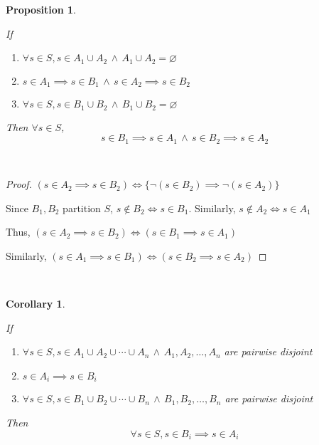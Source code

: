\documentclass{article}
\newtheorem*{thm}{Proposition}
\newtheorem*{corollary}{Corollary}
\theoremstyle{definition}\newtheorem{definition}{Definition}
\begin{document}
	\begin{thm}\
	
	If
		\begin{enumerate}
			\item $\forall s \in S, s\in A_1 \cup A_2 \, \land \, A_1 \cup A_2 = \varnothing$ 
			\item $s\in A_1 \implies s \in B_1 \, \land \, s\in A_2 \implies s \in B_2$
			\item $\forall s \in S, s\in B_1 \cup B_2 \, \land \, B_1 \cup B_2 = \varnothing$
		\end{enumerate}
	Then $\forall s \in S$,
		$$s\in B_1 \implies s \in A_1 \, \land \, s\in B_2 \implies s \in A_2$$
	\end{thm}
	\
	\begin{proof}
			$(s\in A_2 \implies s \in B_2) \iff \{ \lnot (s \in B_2) \implies \lnot (s\in A_2) \}$
			
			Since $B_1, B_2$ partition $S$, $s \not\in B_2 \iff s\in B_1$. Similarly, $s \not\in A_2 \iff s\in A_1$ 
			
			Thus, $(s\in A_2 \implies s \in B_2) \iff (s\in B_1 \implies s \in A_1)$
			
			Similarly, $(s\in A_1 \implies s \in B_1) \iff (s\in B_2 \implies s \in A_2)$ 
	\end{proof}
	
\	
	\begin{corollary}\
	
	If
		\begin{enumerate}
			\item $\forall s \in S, s\in A_1 \cup A_2 \cup \cdots \cup A_n \, \land \, A_1,A_2,\ldots,A_n$ are pairwise disjoint
			\item $s\in A_i \implies s \in B_i$
			\item $\forall s \in S, s\in B_1 \cup B_2 \cup \cdots \cup B_n \, \land \, B_1,B_2,\ldots,B_n$ are pairwise disjoint
		\end{enumerate}
	Then $$\forall s \in S, s\in B_i \implies s \in A_i$$
	\end{corollary}
\end{document}

